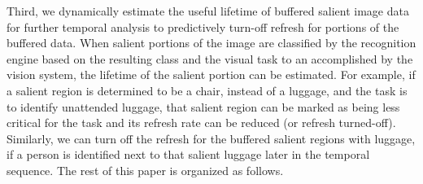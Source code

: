 Third, we dynamically estimate the useful lifetime of buffered salient image data for further temporal analysis to predictively turn-off refresh for portions of the buffered data. When salient portions of the image are classified by the recognition engine based on the resulting class and the visual task to an accomplished by the vision system, the lifetime of the salient portion can be estimated. For example, if a salient region is determined to be a chair, instead of a luggage, and the task is to identify unattended luggage, that salient region can be marked as being less critical for the task and its refresh rate can be reduced (or refresh turned-off). Similarly, we can turn off the refresh for the buffered salient regions with luggage, if a person is identified next to that salient luggage later in the temporal sequence. 
The rest of this paper is organized as follows.

